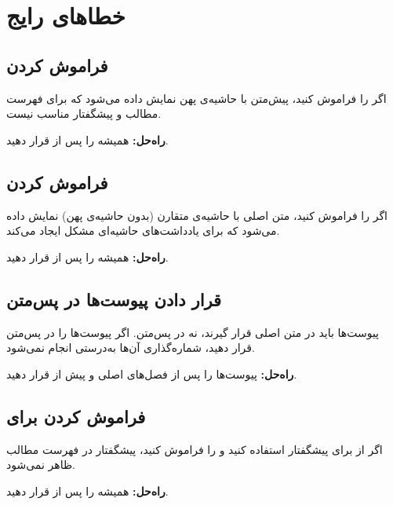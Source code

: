 \section{خطاهای رایج}
\label{sec:book-structure-mistakes}

\subsection{فراموش کردن }
\label{sec:book-structure-mistake-frontgeo}

اگر  را فراموش کنید،
پیش‌متن با حاشیه‌ی پهن نمایش داده می‌شود که
برای فهرست مطالب و پیشگفتار مناسب نیست.

\textbf{راه‌حل:} همیشه  را
پس از  قرار دهید.

\subsection{فراموش کردن }
\label{sec:book-structure-mistake-maingeo}

اگر  را فراموش کنید،
متن اصلی با حاشیه‌ی متقارن (بدون حاشیه‌ی پهن)
نمایش داده می‌شود که برای یادداشت‌های حاشیه‌ای
مشکل ایجاد می‌کند.

\textbf{راه‌حل:} همیشه  را
پس از  قرار دهید.

\subsection{قرار دادن پیوست‌ها در پس‌متن}
\label{sec:book-structure-mistake-appendix}

پیوست‌ها باید در متن اصلی قرار گیرند، نه در
پس‌متن. اگر پیوست‌ها را در پس‌متن قرار دهید،
شماره‌گذاری آن‌ها به‌درستی انجام نمی‌شود.

\textbf{راه‌حل:} پیوست‌ها را پس از فصل‌های اصلی
و پیش از  قرار دهید.

\subsection{فراموش کردن  برای }
\label{sec:book-structure-mistake-addcontentsline}

اگر از  برای پیشگفتار استفاده
کنید و  را فراموش کنید،
پیشگفتار در فهرست مطالب ظاهر نمی‌شود.

\textbf{راه‌حل:} همیشه  را
پس از  قرار دهید.

